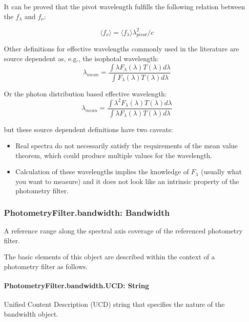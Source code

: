 \documentclass[11pt,a4paper]{ivoa}
\begin{document}
It can be proved that the pivot wavelength fulfills the following
relation between the $f_\lambda$ and  $f_\nu $:

\begin{equation} \label{eq:18}
\langle f_\nu \rangle =\langle f_\lambda \rangle \lambda^2_{pivot}/c
\end{equation}

Other definitions for effective wavelengths commonly used in the literature
are source dependent as, e.g., the isophotal wavelength:
\begin{equation} \label{eq:19}
\lambda_{mean} = \frac{\int \lambda F_\lambda(\lambda)T(\lambda)d\lambda}{\int F_\lambda(\lambda)T(\lambda)d\lambda}
\end{equation}

Or the photon distribution based effective wavelength:
\begin{equation} \label{eq:20}
\lambda_{mean} = \frac{\int \lambda^2 F_\lambda(\lambda)T(\lambda)d\lambda}{\int \lambda F_\lambda(\lambda)T(\lambda)d\lambda}
\end{equation}

but these source dependent definitions have two caveats:

\begin{itemize}
	\item{Real spectra do not necessarily satisfy the requirements of the mean value theorem,
	which could produce multiple values for the wavelength.}

	\item{Calculation of these wavelengths implies the knowledge of $F_\lambda $ (usually
	what you want to measure) and it does not look like an intrinsic property of the
	photometry filter.}
\end{itemize}\par

\subsubsection{PhotometryFilter.bandwidth: Bandwidth}
A reference range along the spectral axis coverage of the referenced photometry filter.
\par

The basic elements of this object are described
within the context of a photometry filter as follows.
\par

\paragraph{PhotometryFilter.bandwidth.UCD: String}
Unified Content Description (UCD) string that specifies the nature of the bandwidth object.
\par
\end{document}
